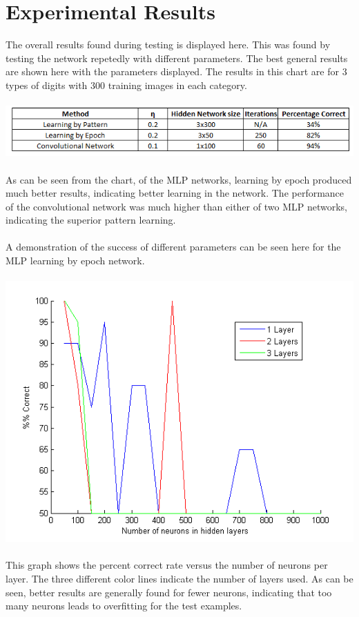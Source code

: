 \documentclass[paper=a4, fontsize=11pt]{scrartcl} %
\numberwithin{equation}{section} %
\numberwithin{figure}{section} %
\numberwithin{table}{section} %
\begin{document}
	\newpage
	\section{Experimental Results}
	The overall results found during testing is displayed here. This was found by testing the network repetedly with different parameters. The best general results are shown here with the parameters displayed. The results in this chart are for 3 types of digits with 300 training images in each category.
	\\\\
	\hspace*{-.1cm}\includegraphics[scale=0.9]{overall_results}
	\\\\
	As can be seen from the chart, of the MLP networks, learning by epoch produced much better results, indicating better learning in the network. The performance of the convolutional network was much higher than either of two MLP networks, indicating the superior pattern learning.
	\\\\
	A demonstration of the success of different parameters can be seen here for the MLP learning by epoch network.
	\\\\
	\hspace*{-.1cm}\includegraphics[scale=0.9]{num_neurons_for_learning}
	\\\\
	This graph shows the percent correct rate versus the number of neurons per layer. The three different color lines indicate the number of layers used. As can be seen, better results are generally found for fewer neurons, indicating that too many neurons leads to overfitting for the test examples.
	\newpage
\end{document}
